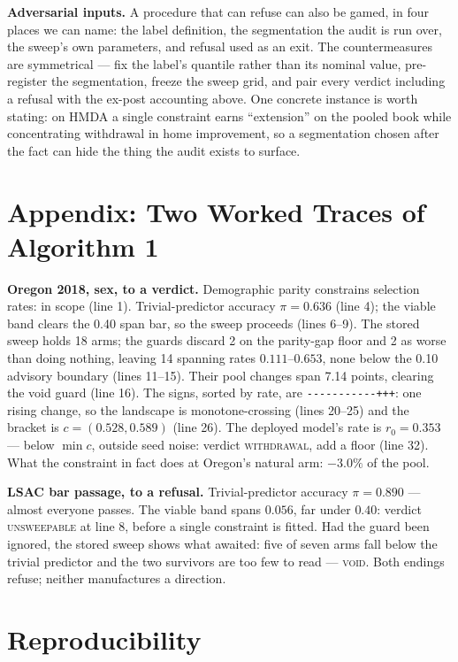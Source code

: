 \documentclass[conference]{IEEEtran}
\begin{document}
\textbf{Adversarial inputs.} A procedure that can refuse can also be gamed, in four places we
can name: the label definition, the segmentation the audit is run over, the sweep's own
parameters, and refusal used as an exit. The countermeasures are symmetrical --- fix the
label's quantile rather than its nominal value, pre-register the segmentation, freeze the
sweep grid, and pair every verdict including a refusal with the ex-post accounting above. One
concrete instance is worth stating: on HMDA a single constraint earns ``extension'' on the
pooled book while concentrating withdrawal in home improvement, so a segmentation chosen after
the fact can hide the thing the audit exists to surface.

\section*{Appendix: Two Worked Traces of Algorithm 1}

\textbf{Oregon 2018, sex, to a verdict.} Demographic parity constrains selection rates:
in scope (line 1). Trivial-predictor accuracy $\pi = 0.636$ (line 4); the viable band
clears the 0.40 span bar, so the sweep proceeds (lines 6--9). The stored sweep holds 18
arms; the guards discard 2 on the parity-gap floor and 2 as worse than doing nothing,
leaving 14 spanning rates $0.111$--$0.653$, none below the 0.10 advisory boundary
(lines 11--15). Their pool changes span 7.14 points, clearing the void guard (line 16).
The signs, sorted by rate, are
\texttt{-{}-{}-{}-{}-{}-{}-{}-{}-{}-{}-{}+++}: one rising change, so the landscape is
monotone-crossing (lines 20--25) and the bracket is $c = (0.528, 0.589)$ (line 26). The
deployed model's rate is $r_0 = 0.353$ --- below $\min c$, outside seed noise: verdict
\textsc{withdrawal}, add a floor (line 32). What the constraint in fact does at Oregon's
natural arm: $-3.0\%$ of the pool.

\textbf{LSAC bar passage, to a refusal.} Trivial-predictor accuracy $\pi = 0.890$ ---
almost everyone passes. The viable band spans $0.056$, far under $0.40$: verdict
\textsc{unsweepable} at line 8, before a single constraint is fitted. Had the guard been
ignored, the stored sweep shows what awaited: five of seven arms fall below the trivial
predictor and the two survivors are too few to read --- \textsc{void}. Both endings
refuse; neither manufactures a direction.

\section*{Reproducibility}
\end{document}
